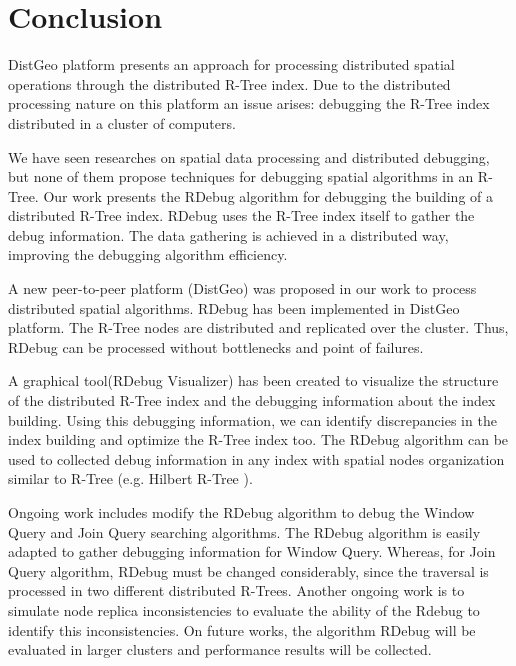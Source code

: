\section{Conclusion}
\label{sec:conclusion}

DistGeo platform presents an approach for processing distributed spatial operations through the distributed R-Tree index. 
Due to the distributed processing nature on this platform an issue arises: debugging the R-Tree index distributed in a cluster of computers.

We have seen researches on spatial data processing and distributed debugging, but none of them propose techniques for debugging spatial algorithms in an R-Tree. 
Our work presents the RDebug algorithm for debugging the building of a distributed R-Tree index. 
RDebug uses the R-Tree index itself to gather the debug information. 
The data gathering is achieved in a distributed way, improving the debugging algorithm efficiency.

A new peer-to-peer platform (DistGeo) was proposed in our work to process distributed spatial algorithms.
RDebug has been implemented in DistGeo platform. The R-Tree nodes are distributed and replicated over the cluster. 
Thus, RDebug can be processed without bottlenecks and point of failures.

A graphical tool(RDebug Visualizer) has been created to visualize the structure of the distributed R-Tree index and the debugging information about the index building. 
Using this debugging information, we can identify discrepancies in the index building and optimize the R-Tree index too.
The RDebug algorithm can be used to collected debug information in any index with spatial nodes organization similar to R-Tree (e.g. Hilbert R-Tree \cite{kamel1994hilbert}).

Ongoing work includes modify the RDebug algorithm to debug the Window Query and Join Query searching algorithms. 
The RDebug algorithm is easily adapted to gather debugging information for Window Query. 
Whereas, for Join Query algorithm, RDebug must be changed considerably, since the traversal is processed in two different distributed R-Trees. 
Another ongoing work is to simulate node replica inconsistencies to evaluate the ability of the Rdebug to identify this inconsistencies.
On future works, the algorithm RDebug will be evaluated in larger clusters and performance results will be collected.